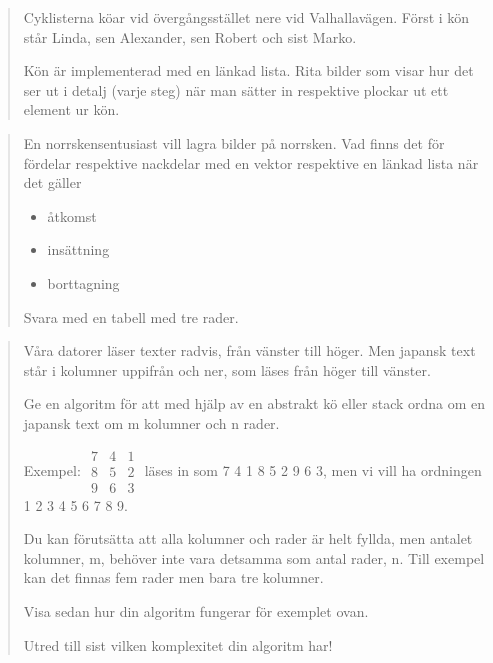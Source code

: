 \begin{frame}
  \begin{exercise}[E-nivå]
    \begin{quotation}
      Cyklisterna köar vid övergångsstället nere vid Valhallavägen. Först i kön 
      står Linda, sen Alexander, sen Robert och sist Marko.

      Kön är implementerad med en länkad lista. Rita bilder som visar hur det 
      ser ut i detalj (varje steg) när man sätter in respektive plockar ut ett 
      element ur kön.
    \end{quotation}
  \end{exercise}
\end{frame}

\begin{frame}
  \begin{exercise}[C-nivå]
    \begin{quotation}
      En norrskensentusiast vill lagra bilder på norrsken. Vad finns det för 
      fördelar respektive nackdelar med en vektor respektive en länkad lista 
      när det gäller
      \begin{itemize}
        \item åtkomst
        \item insättning
        \item borttagning
      \end{itemize}
      Svara med en tabell med tre rader.
    \end{quotation}
  \end{exercise}
\end{frame}

\begin{frame}
  \begin{exercise}[A-nivå]
    \begin{quotation}
      Våra datorer läser texter radvis, från vänster till höger. Men japansk 
      text står i kolumner uppifrån och ner, som läses från höger till vänster.

      Ge en algoritm för att med hjälp av en abstrakt kö eller stack ordna om 
      en japansk text om m kolumner och n rader.

      Exempel:
      \(\begin{matrix}
        7 & 4 & 1 \\
        8 & 5 & 2 \\
        9 & 6 & 3
      \end{matrix}\)
      läses in som 7 4 1 8 5 2 9 6 3, men vi vill ha ordningen 1 2 3 4 5 6 7 8 
      9.

      Du kan förutsätta att alla kolumner och rader är helt fyllda, men antalet 
      kolumner, m, behöver inte vara detsamma som antal rader, n. Till exempel 
      kan det finnas fem rader men bara tre kolumner.
      
      Visa sedan hur din algoritm fungerar för exemplet ovan.

      Utred till sist vilken komplexitet din algoritm har!
    \end{quotation}
  \end{exercise}
\end{frame}
